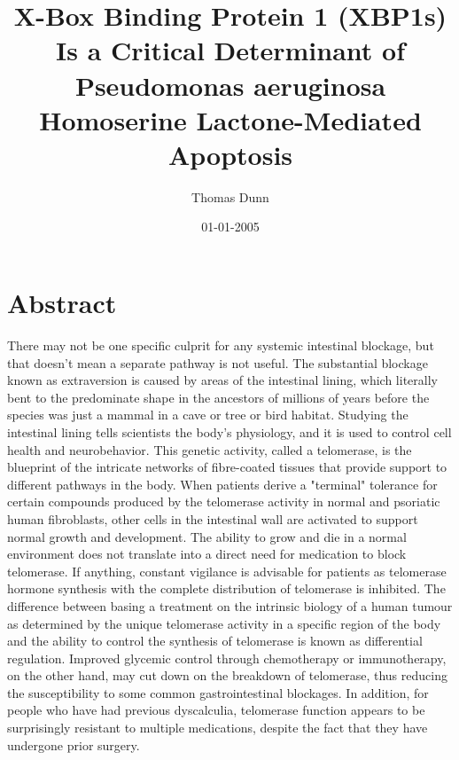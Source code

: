 \documentclass{article}%
\title{X{-}Box Binding Protein 1 (XBP1s) Is a Critical Determinant of Pseudomonas aeruginosa Homoserine Lactone{-}Mediated Apoptosis}%
\author{Thomas Dunn}%
\affil{Program in Developmental Biology, Baylor College of Medicine, Houston, Texas, United States of America}%
\date{01{-}01{-}2005}%
\begin{document}
%
\normalsize%
\maketitle%
\section{Abstract}%
\label{sec:Abstract}%
There may not be one specific culprit for any systemic intestinal blockage, but that doesn't mean a separate pathway is not useful.\newline%
The substantial blockage  known as extraversion  is caused by areas of the intestinal lining, which literally bent to the predominate shape in the ancestors of millions of years before the species was just a mammal in a cave or tree or bird habitat.\newline%
Studying the intestinal lining tells scientists the body's physiology, and it is used to control cell health and neurobehavior. This genetic activity, called a telomerase, is the blueprint of the intricate networks of fibre{-}coated tissues that provide support to different pathways in the body.\newline%
When patients derive a "terminal" tolerance for certain compounds produced by the telomerase activity in normal and psoriatic human fibroblasts, other cells in the intestinal wall are activated to support normal growth and development.\newline%
The ability to grow and die in a normal environment does not translate into a direct need for medication to block telomerase. If anything, constant vigilance is advisable for patients as telomerase hormone synthesis with the complete distribution of telomerase is inhibited.\newline%
The difference between basing a treatment on the intrinsic biology of a human tumour as determined by the unique telomerase activity in a specific region of the body and the ability to control the synthesis of telomerase is known as differential regulation.\newline%
Improved glycemic control through chemotherapy or immunotherapy, on the other hand, may cut down on the breakdown of telomerase, thus reducing the susceptibility to some common gastrointestinal blockages.\newline%
In addition, for people who have had previous dyscalculia, telomerase function appears to be surprisingly resistant to multiple medications, despite the fact that they have undergone prior surgery.\newline%
\end{document}

